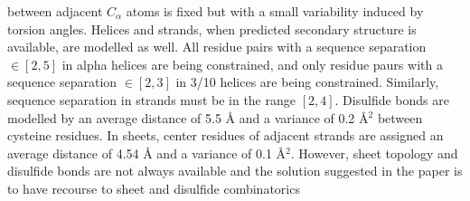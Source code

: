 between adjacent $C_{\alpha}$ atoms is fixed but with a small variability induced by torsion angles.
Helices and strands, when predicted secondary structure is available, are modelled as well.
All residue pairs with a sequence separation $\in [2, 5]$ in alpha helices are being constrained,
and only residue paurs with a sequence separation $\in [2, 3]$ in 3/10 helices are being constrained.
Similarly, sequence separation in strands must be in the range $[2, 4]$.
Disulfide bonds are modelled by an average distance of 5.5 \AA{} and a variance of 0.2 \AA{}$^2$ between cysteine
residues. In sheets, center residues of adjacent strands are assigned an average distance of 4.54 \AA{} and a
variance of 0.1 \AA{}$^2$.
However, sheet topology and disulfide bonds are not always available and the solution suggested in the paper
is to have recourse to sheet and disulfide combinatorics
